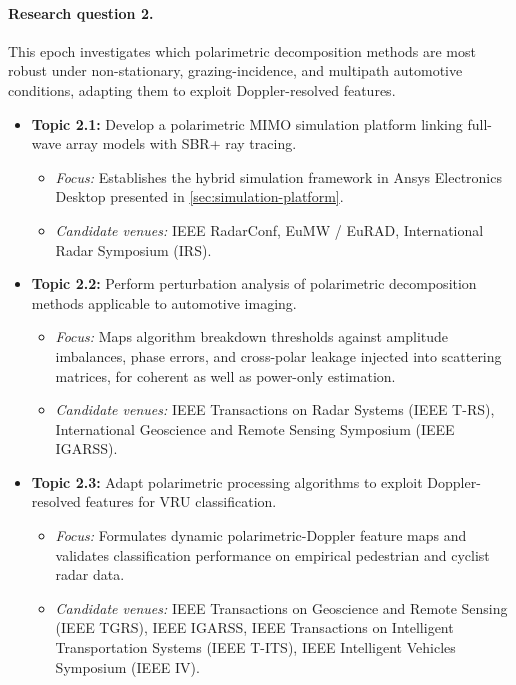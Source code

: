 \paragraph{Research question 2.}
This epoch investigates which polarimetric decomposition methods are most robust under non-stationary, grazing-incidence, and multipath automotive conditions, adapting them to exploit Doppler-resolved features.
\begin{itemize}
    \item \textbf{Topic 2.1:} Develop a polarimetric MIMO simulation platform linking full-wave array models with SBR+ ray tracing.
    \begin{itemize}
        \item \textit{Focus:} Establishes the hybrid simulation framework in Ansys Electronics Desktop presented in \cref{sec:simulation-platform}.
        \item \textit{Candidate venues:} IEEE RadarConf, EuMW / EuRAD, International Radar Symposium (IRS).
    \end{itemize}

    \item \textbf{Topic 2.2:} Perform perturbation analysis of polarimetric decomposition methods applicable to automotive imaging.
    \begin{itemize}
        \item \textit{Focus:} Maps algorithm breakdown thresholds against amplitude imbalances, phase errors, and cross-polar leakage injected into scattering matrices, for coherent as well as power-only estimation.
        \item \textit{Candidate venues:} IEEE Transactions on Radar Systems (IEEE T-RS), International Geoscience and Remote Sensing Symposium (IEEE IGARSS).
    \end{itemize}

    \item \textbf{Topic 2.3:} Adapt polarimetric processing algorithms to exploit Doppler-resolved features for VRU classification.
    \begin{itemize}
        \item \textit{Focus:} Formulates dynamic polarimetric-Doppler feature maps and validates classification performance on empirical pedestrian and cyclist radar data.
        \item \textit{Candidate venues:} IEEE Transactions on Geoscience and Remote Sensing (IEEE TGRS), IEEE IGARSS, IEEE Transactions on Intelligent Transportation Systems (IEEE T-ITS), IEEE Intelligent Vehicles Symposium (IEEE IV).
    \end{itemize}
\end{itemize}

